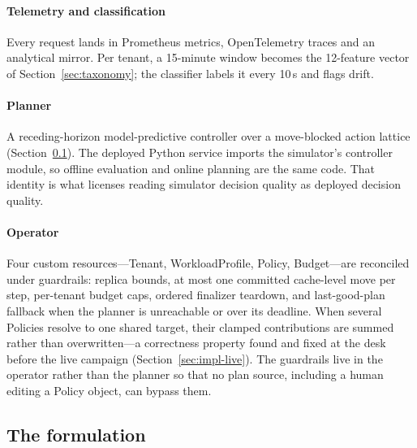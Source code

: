 \paragraph{Telemetry and classification} Every request lands in
Prometheus metrics, OpenTelemetry traces and an analytical mirror. Per
tenant, a 15-minute window becomes the 12-feature vector of
Section~\ref{sec:taxonomy}; the classifier labels it every 10\,s and flags
drift.

\paragraph{Planner} A receding-horizon model-predictive controller over a
move-blocked action lattice (Section~\ref{sec:design-jcac}). The deployed
Python service imports the simulator's controller module, so offline
evaluation and online planning are the same code. That identity is what
licenses reading simulator decision quality as deployed decision quality.

\paragraph{Operator} Four custom resources---Tenant, WorkloadProfile,
Policy, Budget---are reconciled under guardrails: replica bounds, at most
one committed cache-level move per step, per-tenant budget caps, ordered
finalizer teardown, and last-good-plan fallback when the planner is
unreachable or over its deadline. When several Policies resolve to one
shared target, their clamped contributions are summed rather than
overwritten---a correctness property found and fixed at the desk before
the live campaign (Section~\ref{sec:impl-live}). The guardrails live in
the operator rather than the planner so that no plan source, including a
human editing a Policy object, can bypass them.

\subsection{The \jcac{} formulation}
\label{sec:design-jcac}

